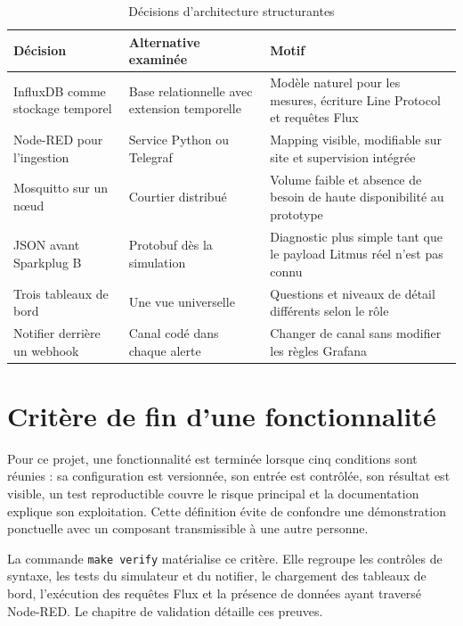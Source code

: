 \begin{table}[H]
\centering
\caption{Décisions d'architecture structurantes}
\begin{tabularx}{\textwidth}{p{}p{}Y}
\toprule
Décision & Alternative examinée & Motif \\
\midrule
InfluxDB comme stockage temporel & Base relationnelle avec extension temporelle &
Modèle naturel pour les mesures, écriture Line Protocol et requêtes Flux \\
Node-RED pour l'ingestion & Service Python ou Telegraf &
Mapping visible, modifiable sur site et supervision intégrée \\
Mosquitto sur un nœud & Courtier distribué &
Volume faible et absence de besoin de haute disponibilité au prototype \\
JSON avant Sparkplug B & Protobuf dès la simulation &
Diagnostic plus simple tant que le payload Litmus réel n'est pas connu \\
Trois tableaux de bord & Une vue universelle &
Questions et niveaux de détail différents selon le rôle \\
Notifier derrière un webhook & Canal codé dans chaque alerte &
Changer de canal sans modifier les règles Grafana \\
\bottomrule
\end{tabularx}
\end{table}

\section{Critère de fin d'une fonctionnalité}

Pour ce projet, une fonctionnalité est terminée lorsque cinq conditions sont
réunies : sa configuration est versionnée, son entrée est contrôlée, son
résultat est visible, un test reproductible couvre le risque principal et la
documentation explique son exploitation. Cette définition évite de confondre
une démonstration ponctuelle avec un composant transmissible à une autre
personne.

La commande \texttt{make verify} matérialise ce critère. Elle regroupe les
contrôles de syntaxe, les tests du simulateur et du notifier, le chargement des
tableaux de bord, l'exécution des requêtes Flux et la présence de données ayant
traversé Node-RED. Le chapitre de validation détaille ces preuves.
